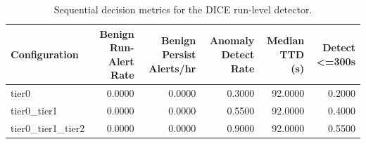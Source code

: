 \begin{table}[t]
\centering
\caption{Sequential decision metrics for the DICE run-level detector.}
\label{tab:dice_sequential_metrics}
\footnotesize
\begin{tabular}{lrrrrr}
\toprule
Configuration & Benign Run-Alert Rate & Benign Persist Alerts/hr & Anomaly Detect Rate & Median TTD (s) & Detect <=300s \\
\midrule
tier0 & 0.0000 & 0.0000 & 0.3000 & 92.0000 & 0.2000 \\
tier0_tier1 & 0.0000 & 0.0000 & 0.5500 & 92.0000 & 0.4000 \\
tier0_tier1_tier2 & 0.0000 & 0.0000 & 0.9000 & 92.0000 & 0.5500 \\
\bottomrule
\end{tabular}

\end{table}
